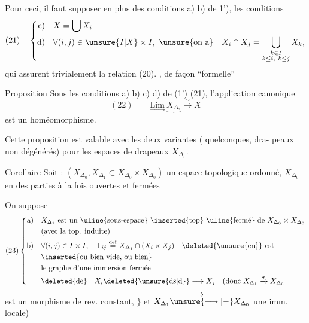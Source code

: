 Pour ceci, il faut supposer en plus des
conditions a) b) de 1'), les conditions
\[
(21)\quad\left\{\begin{aligned}
\text{c)}\quad&X=\bigcup X_i\\
\text{d)}\quad&\forall(i,j)\in\unsure{I|X}\times I,\ \text{\unsure{on a}}\quad
X_i\cap X_j=\bigcup_{\substack{k\in I\\k\leq i,\ k\leq j}}X_k,
\end{aligned}\right.
\]
qui assurent trivialement la relation (20).
, de façon  ``formelle'' \unsure{:|;}

\uline{Proposition} Sous les conditions a) b) c) d)
de (1') (21), l'application canonique
\[
(22)\qquad\underset{\longrightarrow}{\mathrm{Lim}}\ \underbrace{X_{\Delta_*}}\xrightarrow{\sim}X
\]
est un homéomorphisme.

Cette proposition est valable avec les
deux variantes ( quelconques, dra-
peaux non dégénérés) pour les
espaces de drapeaux $X_{\Delta_r}$.

\uline{Corollaire} Soit : $(X_{\Delta_0},X_{\Delta_1}\subset X_{\Delta_0}\times X_{\Delta_0})$
un espace topologique ordonné, 
  $X_{\Delta_0}$ en des parties à la fois ouvertes et fermées

On suppose
\[
(23)\left\{\begin{aligned}
\text{a)}\quad &X_{\Delta_1}\text{ est un \uline{sous-espace} \inserted{top} \uline{fermé} de }X_{\Delta_0}\times X_{\Delta_0}\\
&\text{(avec la top. induite)}\\
\text{b)}\quad &\forall(i,j)\in I\times I,\quad\Gamma_{ij}\overset{\mathrm{def}}{=}X_{\Delta_1}\cap(X_i\times X_j)\quad\text{\deleted{\unsure{en}} est}\\
&\text{\inserted{ou bien vide, ou bien}}\\
&\text{le graphe d'une immersion fermée}\\
&\deleted{\text{de}}\quad X_i\deleted{\text{\unsure{ds|d}}}\longrightarrow X_j
\quad\text{(donc }X_{\Delta_1}\xrightarrow{\sigma}X_{\Delta_0}
\end{aligned}\right.
\]
est un morphisme de rev.  constant, $\}$
 et
$X_{\Delta_1}\overset{b}{\unsure{\longrightarrow|-}}X_{\Delta_0}$ une imm. locale)

